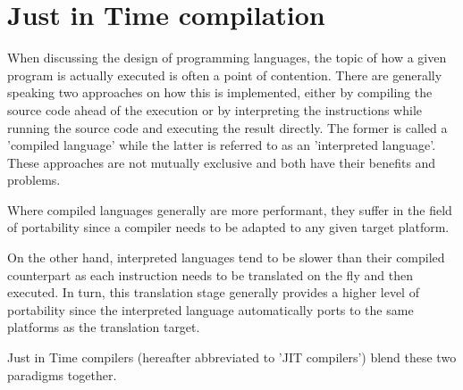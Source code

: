 \chapter{Just in Time compilation}

When discussing the design of programming languages, the topic of how a given program is actually executed is often a point of contention. 
There are generally speaking two approaches on how this is implemented, either by compiling the source code ahead of the execution or by interpreting the instructions while running the source code and executing the result directly. 
The former is called a 'compiled language' while the latter is referred to as an 'interpreted language'. 
These approaches are not mutually exclusive and both have their benefits and problems. 

Where compiled languages generally are more performant, they suffer in the field of portability since a compiler needs to be adapted to any given target platform. 

On the other hand, interpreted languages tend to be slower than their compiled counterpart as each instruction needs to be translated on the fly and then executed. In turn, this translation stage generally provides a higher level of portability since the interpreted language automatically ports to the same platforms as the translation target. 

Just in Time compilers (hereafter abbreviated to 'JIT compilers') blend these two paradigms together.


